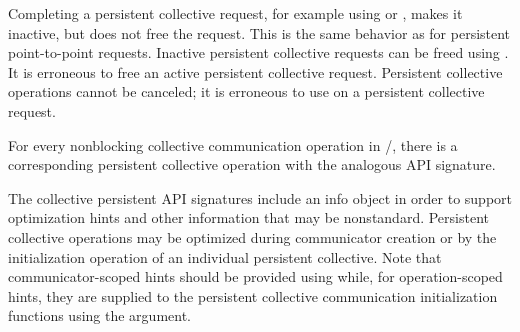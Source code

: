 Completing a persistent collective request,
for example using  or ,
makes it inactive, but does not free the request.
This is the same behavior as for persistent point-to-point requests.
%
Inactive persistent collective requests
can be freed using .
It is erroneous to free an active persistent collective request.
Persistent collective operations cannot be canceled;
it is erroneous to use  on a persistent collective request.

For every nonblocking collective communication operation in \MPI/, there is
a corresponding persistent collective operation with the analogous API
signature.

The collective persistent API signatures include an info object in order to support
optimization hints and other information that may be nonstandard.
Persistent collective operations may be optimized during communicator
creation or by the initialization operation of an individual persistent collective.
%
Note that communicator-scoped hints should be provided using  while,
for operation-scoped hints, they are supplied to the persistent collective communication initialization functions
using the  argument.
%
%
%

%
%
%



